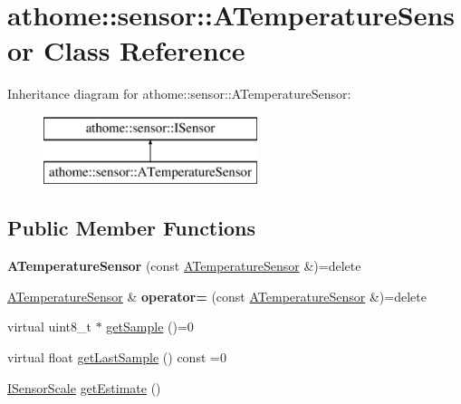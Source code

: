 \hypertarget{classathome_1_1sensor_1_1_a_temperature_sensor}{}\section{athome\+:\+:sensor\+:\+:A\+Temperature\+Sensor Class Reference}
\label{classathome_1_1sensor_1_1_a_temperature_sensor}
Inheritance diagram for athome\+:\+:sensor\+:\+:A\+Temperature\+Sensor\+:\begin{figure}[H]
\begin{center}
\leavevmode
\includegraphics[height=2.000000cm]{classathome_1_1sensor_1_1_a_temperature_sensor}
\end{center}
\end{figure}
\subsection*{Public Member Functions}
\begin{DoxyCompactItemize}
\item 
\mbox{\label{classathome_1_1sensor_1_1_a_temperature_sensor_adc643a183aa4e4ae6b6c8c9212aa6525}} 
{\bfseries A\+Temperature\+Sensor} (const \mbox{\hyperlink{classathome_1_1sensor_1_1_a_temperature_sensor}{A\+Temperature\+Sensor}} \&)=delete
\item 
\mbox{\label{classathome_1_1sensor_1_1_a_temperature_sensor_a0eb5857e7a283d824b183eb55239e9fe}} 
\mbox{\hyperlink{classathome_1_1sensor_1_1_a_temperature_sensor}{A\+Temperature\+Sensor}} \& {\bfseries operator=} (const \mbox{\hyperlink{classathome_1_1sensor_1_1_a_temperature_sensor}{A\+Temperature\+Sensor}} \&)=delete
\item 
virtual uint8\+\_\+t $\ast$ \mbox{\hyperlink{classathome_1_1sensor_1_1_a_temperature_sensor_a397794217f3163950add6d28f69a6202}{get\+Sample}} ()=0
\item 
virtual float \mbox{\hyperlink{classathome_1_1sensor_1_1_a_temperature_sensor_a1063bddc4a031d80f68a83317b64fbb2}{get\+Last\+Sample}} () const =0
\item 
\mbox{\hyperlink{classathome_1_1sensor_1_1_i_sensor_aa70bc27a4c17c86caf96cca776541ddf}{I\+Sensor\+Scale}} \mbox{\hyperlink{classathome_1_1sensor_1_1_a_temperature_sensor_a3997ff080f6a9e444c52a63f1b40d73c}{get\+Estimate}} ()
\end{DoxyCompactItemize}
